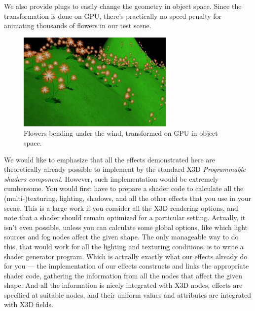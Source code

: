 \documentclass{acmsiggraph}                     %
\begin{document}

We also provide plugs to easily change the geometry in object space.
Since the transformation is done on GPU, there's practically
no speed penalty for animating thousands of flowers in our test scene.

\setcounter{figure}{9}
\begin{figure}[H]
  \centering
  \includegraphics[width=3in]{flowers}
  \caption{Flowers bending under the wind, transformed on GPU in object space.}
\end{figure}

We would like to emphasize that all the effects demonstrated here
are theoretically already possible to implement by the standard
X3D \textit{Programmable shaders component}. However, such implementation
would be extremely cumbersome.
You would first have to prepare a shader code to calculate all
the (multi-)texturing, lighting,
shadows, and all the other effects that you use in your scene.
This is a large work if you consider all the X3D rendering options, and note that
a shader should remain optimized for a particular setting.
Actually, it isn't even possible, unless you can calculate some global options,
like which light sources and fog nodes affect the given shape.
The only manageable way to do this, that would work for all the lighting
and texturing conditions, is to write a shader generator program.
Which is actually exactly what our effects already do for you ---
the implementation of our effects constructs and links
the appropriate shader code, gathering the information from all the nodes
that affect the given shape. And all the information is nicely integrated
with X3D nodes, effects are specified at suitable nodes, and their
uniform values and attributes are integrated with X3D fields.
\end{document}
